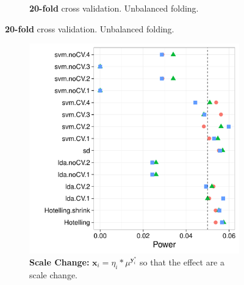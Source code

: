 \documentclass[12pt,a4paper]{article}
\theoremstyle{definition}
\newcommand{\rv}[1]{\mathbf{#1}} %
\newcommand{\x}{\rv x} %
\newcommand{\y}{\rv y} %
\newcommand{\mycaption}{Simulation details in Appendix~\ref{apx:simulation_details} except the changes in the sub-captions.}
\begin{document}
\begin{figure}[h]
\begin{subfigure}{.5\textwidth}
	  \caption{\textbf{20-fold} cross validation. Unbalanced folding.} 
	\label{fig:n_folds_unbalanced_2}
	\end{subfigure}
\end{figure}



\begin{figure}[h]
\centering
\caption{\mycaption}	
	\begin{subfigure}{.5\textwidth}
	  \centering
	  \includegraphics[width=1\linewidth]{"art/2016-07-30 10:33:05"}
	  \caption{\textbf{Scale Change:} $\x_i =  \eta_i * \mu^ {\y^*_i}$ so that the effect are a scale change.}  
	\label{fig:scale_change}
	\end{subfigure}%
	\begin{subfigure}{.5\textwidth}
	  \centering

\end{subfigure}
\end{figure}
\end{document}

